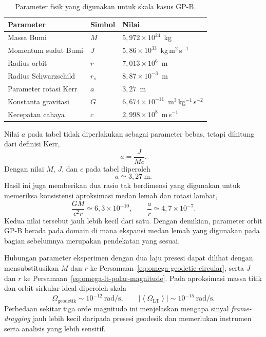 \begin{table}[ht]
\centering
\caption{Parameter fisik yang digunakan untuk skala kasus GP-B.}
\label{tab:param-gpb}
\begin{tabular}{lll}
\toprule
\textbf{Parameter} & \textbf{Simbol} & \textbf{Nilai} \\
\midrule
Massa Bumi             & $M$    & $5{,}972 \times 10^{24}$~kg \\
Momentum sudut Bumi    & $J$    & $5{,}86 \times 10^{33}$~kg\,m$^2$\,s$^{-1}$ \\
Radius orbit           & $r$    & $7{,}013 \times 10^{6}$~m \\
Radius Schwarzschild   & $r_s$  & $8{,}87 \times 10^{-3}$~m \\
Parameter rotasi Kerr  & $a$    & $3{,}27$~m \\
Konstanta gravitasi    & $G$    & $6{,}674 \times 10^{-11}$~m$^3$\,kg$^{-1}$\,s$^{-2}$ \\
Kecepatan cahaya       & $c$    & $2{,}998 \times 10^{8}$~m\,s$^{-1}$ \\
\bottomrule
\end{tabular}
\end{table}

Nilai $a$ pada tabel tidak diperlakukan sebagai parameter bebas, tetapi
dihitung dari definisi Kerr,
\begin{equation}
    a=\frac{J}{Mc}.
    \label{eq:gpb-a-definition}
\end{equation}
Dengan nilai $M$, $J$, dan $c$ pada tabel diperoleh
\begin{equation}
    a\simeq3{,}27~\text{m}.
    \label{eq:gpb-a-value}
\end{equation}
Hasil ini juga memberikan dua rasio tak berdimensi yang digunakan untuk
memeriksa konsistensi aproksimasi medan lemah dan rotasi lambat,
\begin{equation}
    \frac{GM}{c^2r}
    \simeq6{,}3\times10^{-10},
    \qquad
    \frac{a}{r}
    \simeq4{,}7\times10^{-7}.
    \label{eq:gpb-small-parameters}
\end{equation}
Kedua nilai tersebut jauh lebih kecil dari satu. Dengan demikian,
parameter orbit GP-B berada pada domain di mana ekspansi medan lemah yang
digunakan pada bagian sebelumnya merupakan pendekatan yang sesuai.

Hubungan parameter eksperimen dengan dua laju presesi dapat dilihat dengan
mensubstitusikan $M$ dan $r$ ke Persamaan~\eqref{eq:omega-geodetic-circular},
serta $J$ dan $r$ ke Persamaan~\eqref{eq:omega-lt-polar-magnitude}. Pada
aproksimasi massa titik dan orbit sirkular ideal diperoleh skala
\begin{equation}
    \Omega_{\mathrm{geodetik}}
    \sim10^{-12}~\text{rad/s},
    \qquad
    \left|\left\langle\Omega_{\mathrm{LT}}\right\rangle\right|
    \sim10^{-15}~\text{rad/s}.
    \label{eq:gpb-precession-scales}
\end{equation}
Perbedaan sekitar tiga orde magnitudo ini menjelaskan mengapa sinyal
\textit{frame-dragging} jauh lebih kecil daripada presesi geodesik dan
memerlukan instrumen serta analisis yang lebih sensitif.

